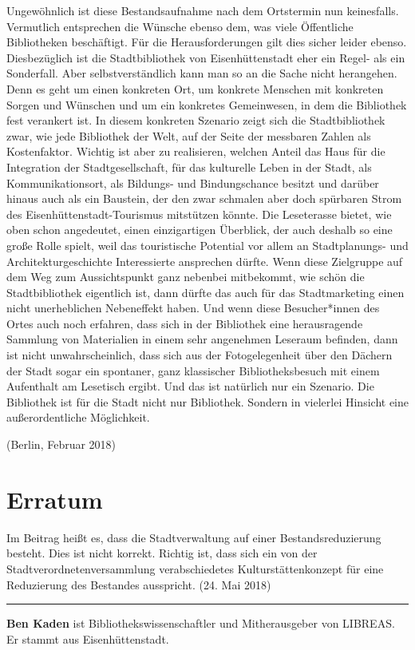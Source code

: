 \documentclass[a4paper,
fontsize=11pt,
oneside,
numbers=noperiodatend,
parskip=half-,
bibliography=totoc,
final
]{scrartcl}
\begin{document}
Ungewöhnlich ist diese Bestandsaufnahme nach dem Ortstermin nun
keinesfalls. Vermutlich entsprechen die Wünsche ebenso dem, was viele
Öffentliche Bibliotheken beschäftigt. Für die Herausforderungen gilt
dies sicher leider ebenso. Diesbezüglich ist die Stadtbibliothek von
Eisenhüttenstadt eher ein Regel- als ein Sonderfall. Aber
selbstverständlich kann man so an die Sache nicht herangehen. Denn es
geht um einen konkreten Ort, um konkrete Menschen mit konkreten Sorgen
und Wünschen und um ein konkretes Gemeinwesen, in dem die Bibliothek
fest verankert ist. In diesem konkreten Szenario zeigt sich die
Stadtbibliothek zwar, wie jede Bibliothek der Welt, auf der Seite der
messbaren Zahlen als Kostenfaktor. Wichtig ist aber zu realisieren,
welchen Anteil das Haus für die Integration der Stadtgesellschaft, für
das kulturelle Leben in der Stadt, als Kommunikationsort, als Bildungs-
und Bindungschance besitzt und darüber hinaus auch als ein Baustein, der
den zwar schmalen aber doch spürbaren Strom des
Eisenhüttenstadt-Tourismus mitstützen könnte. Die Leseterasse bietet,
wie oben schon angedeutet, einen einzigartigen Überblick, der auch
deshalb so eine große Rolle spielt, weil das touristische Potential vor
allem an Stadtplanungs- und Architekturgeschichte Interessierte
ansprechen dürfte. Wenn diese Zielgruppe auf dem Weg zum Aussichtspunkt
ganz nebenbei mitbekommt, wie schön die Stadtbibliothek eigentlich ist,
dann dürfte das auch für das Stadtmarketing einen nicht unerheblichen
Nebeneffekt haben. Und wenn diese Besucher*innen des Ortes auch noch
erfahren, dass sich in der Bibliothek eine herausragende Sammlung von
Materialien in einem sehr angenehmen Leseraum befinden, dann ist nicht
unwahrscheinlich, dass sich aus der Fotogelegenheit über den Dächern der
Stadt sogar ein spontaner, ganz klassischer Bibliotheksbesuch mit einem
Aufenthalt am Lesetisch ergibt. Und das ist natürlich nur ein Szenario.
Die Bibliothek ist für die Stadt nicht nur Bibliothek. Sondern in
vielerlei Hinsicht eine außerordentliche Möglichkeit.

(Berlin, Februar 2018)

\hypertarget{erratum}{%
\section{Erratum}\label{erratum}}

Im Beitrag heißt es, dass die Stadtverwaltung auf einer
Bestandsreduzierung besteht. Dies ist nicht korrekt. Richtig ist, dass
sich ein von der Stadtverordnetenversammlung verabschiedetes
Kulturstättenkonzept für eine Reduzierung des Bestandes ausspricht. (24.
Mai 2018)

\begin{center}\rule{0.5\linewidth}{\linethickness}\end{center}

\textbf{Ben Kaden} ist Bibliothekswissenschaftler und Mitherausgeber von
LIBREAS. Er stammt aus Eisenhüttenstadt.
\end{document}

